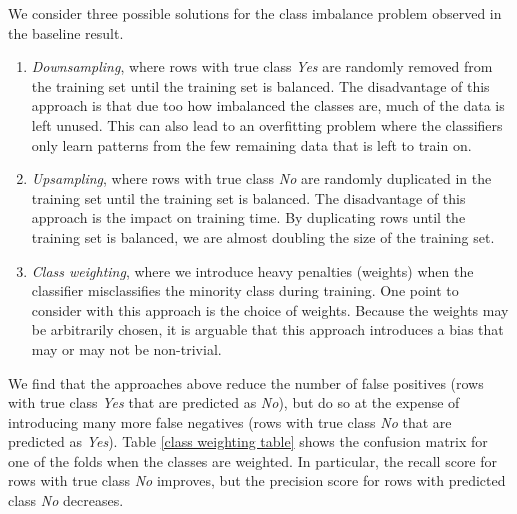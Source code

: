 \documentclass[11pt]{article}
\begin{document}

We consider three possible solutions for the class imbalance problem observed in the baseline result.

\begin{enumerate}

\item
\textit{Downsampling}, where rows with true class \textit{Yes} are randomly removed from the training set until the training set is balanced. The disadvantage of this approach is that due too how imbalanced the classes are, much of the data is left unused. This can also lead to an overfitting problem where the classifiers only learn patterns from the few remaining data that is left to train on.

\item
\textit{Upsampling}, where rows with true class \textit{No} are randomly duplicated in the training set until the training set is balanced. The disadvantage of this approach is the impact on training time. By duplicating rows until the training set is balanced, we are almost doubling the size of the training set.

\item
\textit{Class weighting}, where we introduce heavy penalties (weights) when the classifier misclassifies the minority class during training. One point to consider with this approach is the choice of weights. Because the weights may be arbitrarily chosen, it is arguable that this approach introduces a bias that may or may not be non-trivial.

\end{enumerate}

We find that the approaches above reduce the number of false positives (rows with true class \textit{Yes} that are predicted as \textit{No}), but do so at the expense of introducing many more false negatives (rows with true class \textit{No} that are predicted as \textit{Yes}). Table \ref{class weighting table} shows the confusion matrix for one of the folds when the classes are weighted. In particular, the recall score for rows with true class \textit{No} improves, but the precision score for rows with predicted class \textit{No} decreases.
\\
\end{document}
